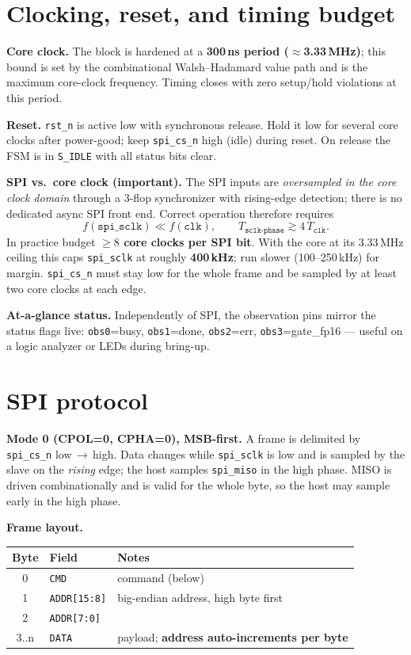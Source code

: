 \documentclass[11pt]{article}
\newcommand{\reg}[1]{\texttt{#1}}
\begin{document}
\section{Clocking, reset, and timing budget}
\label{sec:clk}
\textbf{Core clock.} The block is hardened at a \textbf{300\,ns period
($\approx$3.33\,MHz)}; this bound is set by the combinational Walsh--Hadamard
value path and is the maximum core-clock frequency. Timing closes with zero
setup/hold violations at this period.

\textbf{Reset.} \reg{rst\_n} is active low with synchronous release. Hold it low
for several core clocks after power-good; keep \reg{spi\_cs\_n} high (idle) during
reset. On release the FSM is in \reg{S\_IDLE} with all status bits clear.

\textbf{SPI vs.\ core clock (important).} The SPI inputs are \emph{oversampled in
the core clock domain} through a 3-flop synchronizer with rising-edge detection;
there is no dedicated async SPI front end. Correct operation therefore requires
\[
f(\reg{spi\_sclk}) \ll f(\reg{clk}),\qquad
T_{\reg{sclk-phase}} \gtrsim 4\,T_{\reg{clk}} .
\]
In practice budget \textbf{$\ge 8$ core clocks per SPI bit}. With the core at its
3.33\,MHz ceiling this caps \reg{spi\_sclk} at roughly \textbf{400\,kHz}; run
slower (100--250\,kHz) for margin. \reg{spi\_cs\_n} must stay low for the whole
frame and be sampled by at least two core clocks at each edge.

\textbf{At-a-glance status.} Independently of SPI, the observation pins mirror the
status flags live: \reg{obs0}=busy, \reg{obs1}=done, \reg{obs2}=err,
\reg{obs3}=gate\_fp16 --- useful on a logic analyzer or LEDs during bring-up.

\section{SPI protocol}
\textbf{Mode 0 (CPOL=0, CPHA=0), MSB-first.} A frame is delimited by
\reg{spi\_cs\_n} low\,$\rightarrow$\,high. Data changes while \reg{spi\_sclk} is
low and is sampled by the slave on the \emph{rising} edge; the host samples
\reg{spi\_miso} in the high phase. MISO is driven combinationally and is valid
for the whole byte, so the host may sample early in the high phase.

\textbf{Frame layout.}
\begin{center}
\begin{tabular}{@{}cll@{}}
\toprule
Byte & Field & Notes \\
\midrule
0     & \reg{CMD}       & command (below) \\
1     & \reg{ADDR[15:8]} & big-endian address, high byte first \\
2     & \reg{ADDR[7:0]}  & \\
3..n  & \reg{DATA}      & payload; \textbf{address auto-increments per byte} \\
\bottomrule
\end{tabular}
\end{center}
\end{document}
